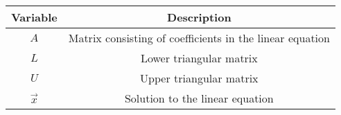 \begin{tabular}{|c|c|}
    \hline
     \textbf{Variable}&\textbf{Description}\\
     \hline
     $A$& Matrix consisting of coefficients in the linear equation\\
     \hline
     $L$& Lower triangular matrix\\
     \hline
     $U$& Upper triangular matrix\\
     \hline
     $\vec{x}$ & Solution to the linear equation\\
     \hline
\end{tabular}
    
